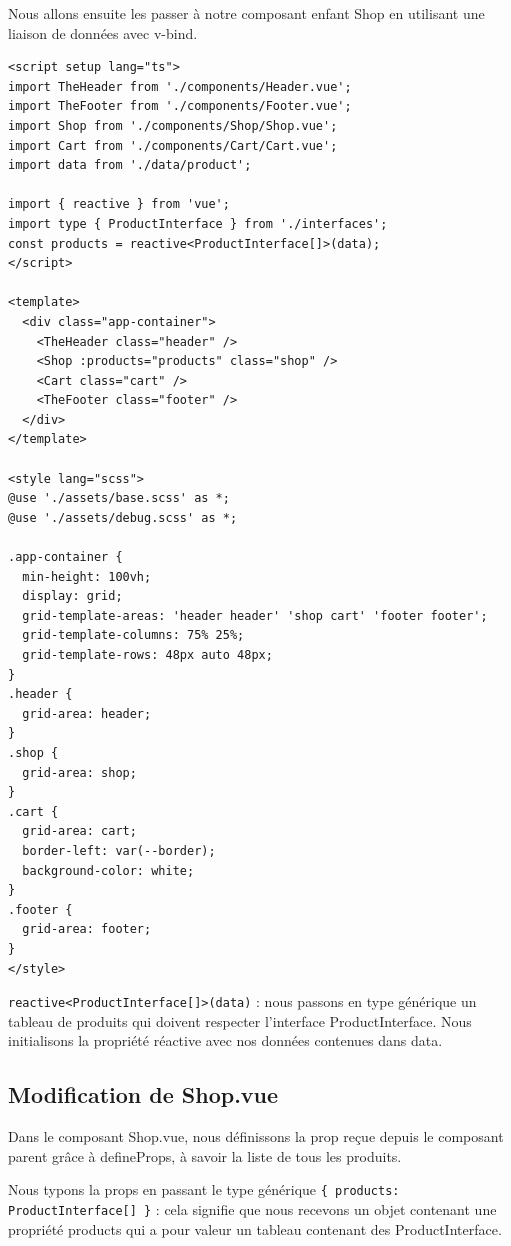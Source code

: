 \documentclass{article}
\begin{document}
Nous allons ensuite les passer à notre composant enfant Shop en utilisant une liaison de données avec v-bind.
\begin{verbatim}
<script setup lang="ts">
import TheHeader from './components/Header.vue';
import TheFooter from './components/Footer.vue';
import Shop from './components/Shop/Shop.vue';
import Cart from './components/Cart/Cart.vue';
import data from './data/product';

import { reactive } from 'vue';
import type { ProductInterface } from './interfaces';
const products = reactive<ProductInterface[]>(data);
</script>

<template>
  <div class="app-container">
    <TheHeader class="header" />
    <Shop :products="products" class="shop" />
    <Cart class="cart" />
    <TheFooter class="footer" />
  </div>
</template>

<style lang="scss">
@use './assets/base.scss' as *;
@use './assets/debug.scss' as *;

.app-container {
  min-height: 100vh;
  display: grid;
  grid-template-areas: 'header header' 'shop cart' 'footer footer';
  grid-template-columns: 75% 25%;
  grid-template-rows: 48px auto 48px;
}
.header {
  grid-area: header;
}
.shop {
  grid-area: shop;
}
.cart {
  grid-area: cart;
  border-left: var(--border);
  background-color: white;
}
.footer {
  grid-area: footer;
}
</style>
\end{verbatim}
{\tt reactive<ProductInterface[]>(data)} : nous passons en type générique un tableau de produits qui doivent respecter l'interface {\color{monOrange}ProductInterface}. Nous initialisons la propriété réactive avec nos données contenues dans {\color{monOrange}data}.

\subsection{Modification de {\color{monOrange}Shop.vue}}
Dans le composant {\color{monOrange}Shop.vue}, nous définissons la {\color{monOrange}prop} reçue depuis le composant parent grâce à {\color{monOrange}defineProps}, à savoir la liste de tous les produits.

Nous typons la {\color{monOrange}props} en passant le type générique {\tt  \{ products: ProductInterface[] \}} : cela signifie que nous recevons un objet contenant une propriété {\color{monOrange}products} qui a pour valeur un tableau contenant des {\color{monOrange}ProductInterface}.
\end{document}
